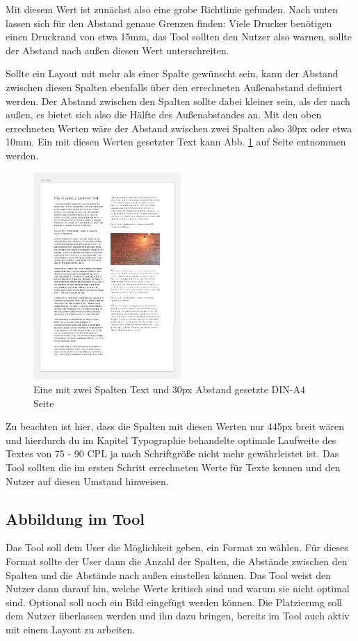 Mit diesem Wert ist zunächst also eine grobe Richtlinie gefunden. Nach unten lassen sich für den Abstand genaue Grenzen finden: Viele Drucker benötigen einen Druckrand von etwa 15mm, das Tool sollten den Nutzer also warnen, sollte der Abstand nach außen diesen Wert unterschreiten.

Sollte ein Layout mit mehr als einer Spalte gewünscht sein, kann der Abstand zwischen diesen Spalten ebenfalls über den errechneten Außenabstand definiert werden. Der Abstand zwischen den Spalten sollte dabei kleiner sein, als der nach außen, es bietet sich also die Hälfte des Außenabstandes an. Mit den oben errechneten Werten wäre der Abstand zwischen zwei Spalten also 30px oder etwa 10mm. Ein mit diesen Werten gesetzter Text kann Abb. \ref{fig:a4-two-col} auf Seite \pageref{fig:a4-two-col} entnommen werden.

\begin{figure}[h]
    \centering
    \includegraphics[width=0.5\textwidth]{images/A4-two-col.png}
    \caption{Eine mit zwei Spalten Text und 30px Abstand gesetzte DIN-A4 Seite}
    \label{fig:a4-two-col}
\end{figure}

Zu beachten ist hier, dass die Spalten mit diesen Werten nur 445px breit wären und hierdurch du im Kapitel Typographie behandelte optimale Laufweite des Textes von 75 - 90 CPL ja nach Schriftgröße nicht mehr gewährleistet ist. Das Tool sollten die im ersten Schritt errechneten Werte für Texte kennen und den Nutzer auf diesen Umstand hinweisen.

\subsection{Abbildung im Tool}
Das Tool soll dem User die Möglichkeit geben, ein Format zu wählen. Für dieses Format sollte der User dann die Anzahl der Spalten, die Abstände zwischen den Spalten und die Abstände nach außen einstellen können.
Das Tool weist den Nutzer dann darauf hin, welche Werte kritisch sind und warum sie nicht optimal sind.
Optional soll noch ein Bild eingefügt werden können. Die Platzierung soll dem Nutzer überlassen werden und ihn dazu bringen, bereits im Tool auch aktiv mit einem Layout zu arbeiten.
